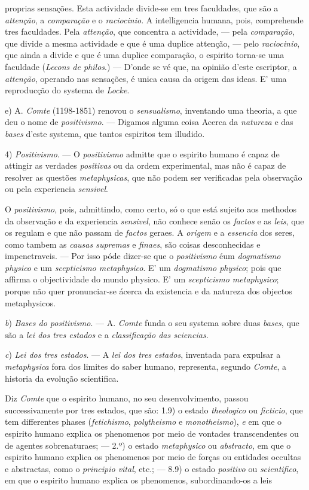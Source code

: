 proprias sensações. Esta actividade divide-se em tres faculdades, que são a \emph{attenção}, a \emph{comparação} e o \emph{raciocinio}. A intelligencia humana, pois, comprehende tres faculdades. Pela \emph{attenção}, que concentra a actividade, --- pela \emph{comparação}, que divide a mesma actividade e que é uma duplice attenção, --- pelo \emph{raciocinio}, que ainda a divide e que é uma duplice comparação, o espirito torna-se uma faculdade (\emph{Lecons de philos}.) --- D'onde se vé que, na opinião d'este escriptor, a \emph{attenção}, operando nas sensações, é unica causa da origem das ideas. E' uma reproducção do systema de \emph{Locke}.\par e) A. \emph{Comte} (1198-1851) renovou o \emph{sensualismo}, inventando uma theoria, a que deu o nome de \emph{positivismo}. --- Digamos alguma coisa Acerca da \emph{natureza} e das \emph{bases} d'este systema, que tantos espiritos tem illudido.\par 4) \emph{Positivismo}. --- O \emph{positivismo} admitte que o espirito humano é capaz de attingir as verdades \emph{positivas} ou da ordem experimental, mas não é capaz de resolver as questões \emph{metaphysicas}, que não podem ser verificadas pela observação ou pela experiencia \emph{sensivel}.\par O \emph{positivismo}, pois, admittindo, como certo, só o que está sujeito aos methodos da observação e da experiencia \emph{sensivel}, não conhece senão os \emph{factos} e as \emph{leis}, que os regulam e que não passam de \emph{factos} geraes. A \emph{origem} e a \emph{essencia} dos seres, como tambem as \emph{causas supremas} e \emph{finaes}, são coisas desconhecidas e impenetraveis. --- Por isso póde dizer-se que o \emph{positivismo} éum \emph{dogmatismo physico} e um \emph{scepticismo metaphysico}. E' um \emph{dogmatismo physico}; pois que affirma o objectividade do mundo physico. E' um \emph{scepticismo metaphysico}; porque não quer pronunciar-se ácerca da existencia e da natureza dos objectos metaphysicos.\par \emph{b}) \emph{Bases do positivismo}. --- A. \emph{Comte} funda o seu systema sobre duas \emph{bases}, que são a \emph{lei dos tres estados} e a \emph{classificação das sciencias}.\par \emph{c}) \emph{Lei dos tres estados}. --- A \emph{lei dos tres estados}, inventada para expulsar a \emph{metaphysica} fora dos limites do saber humano, representa, segundo \emph{Comte}, a historia da evolução scientifica.\par Diz \emph{Comte} que o espirito humano, no seu desenvolvimento, passou successivamente por tres estados, que são: 1.9) o estado \emph{theologico} ou \emph{ficticio}, que tem differentes phases (\emph{fetichismo}, \emph{polytheismo} e \emph{monotheismo}), \emph{e} em que o espirito humano explica os phenomenos por meio de vontades transcendentes ou de agentes sobrenaturaes; --- 2.º) o estado \emph{metaphysico} ou \emph{abstracto}, em que o espirito humano explica os phenomenos por meio de forças ou entidades occultas e abstractas, como o \emph{principio vital}, etc.; --- 8.9) o estado \emph{positivo} ou \emph{scientifico}, em que o espirito humano explica os phenomenos, subordinando-os a leis 